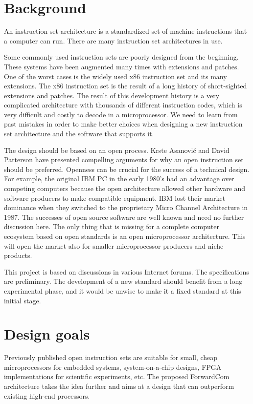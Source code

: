 \documentclass[forwardcom.tex]{subfiles}
\begin{document}
\section{Background}
An instruction set architecture is a standardized set of machine instructions that a computer can run. There are many instruction set architectures in use.
\vspace{2mm}

Some commonly used instruction sets are poorly designed from the beginning. These systems have been augmented many times with extensions and patches. One of the worst cases is the widely used x86 instruction set and its many extensions. The x86 instruction set is the result of a long history of short-sighted extensions and patches. The result of this development history is a very complicated architecture with thousands of different instruction codes, which is very difficult and costly to decode in a microprocessor. We need to learn from past mistakes in order to make better choices when designing a new instruction set architecture and the software that supports it.
\vspace{2mm}

The design should be based on an open process. Krste Asanović and David Patterson have presented compelling arguments for why an open instruction set should be preferred. Openness can be crucial for the success of a technical design. For example, the original IBM PC in the early 1980's had an advantage over competing computers because the open architecture allowed other hardware and software producers to make compatible equipment. IBM lost their market dominance when they switched to the proprietary Micro Channel Architecture in 1987. The successes of open source software are well known and need no further discussion here. The only thing that is missing for a complete computer ecosystem based on open standards is an open microprocessor architecture. This will open the market also for smaller microprocessor producers and niche products.
\vspace{2mm}

This project is based on discussions in various Internet forums. The specifications are preliminary. The development of a new standard should benefit from a long experimental phase, and it would be unwise to make it a fixed standard at this initial stage.


\section{Design goals}
Previously published open instruction sets are suitable for small, cheap microprocessors for embedded systems, system-on-a-chip designs, FPGA implementations for scientific experiments, etc. The proposed ForwardCom architecture takes the idea further and aims at a design that can outperform existing high-end processors.
\vspace{2mm}
\end{document}

